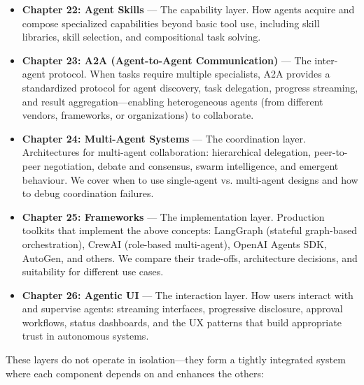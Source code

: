 \begin{itemize}
  \item \textbf{Chapter 22: Agent Skills} --- The capability layer. How agents acquire and compose specialized capabilities beyond basic tool use, including skill libraries, skill selection, and compositional task solving.
  \item \textbf{Chapter 23: A2A (Agent-to-Agent Communication)} --- The inter-agent protocol. When tasks require multiple specialists, A2A provides a standardized protocol for agent discovery, task delegation, progress streaming, and result aggregation---enabling heterogeneous agents (from different vendors, frameworks, or organizations) to collaborate.
  \item \textbf{Chapter 24: Multi-Agent Systems} --- The coordination layer. Architectures for multi-agent collaboration: hierarchical delegation, peer-to-peer negotiation, debate and consensus, swarm intelligence, and emergent behaviour. We cover when to use single-agent vs. multi-agent designs and how to debug coordination failures.
  \item \textbf{Chapter 25: Frameworks} --- The implementation layer. Production toolkits that implement the above concepts: LangGraph (stateful graph-based orchestration), CrewAI (role-based multi-agent), OpenAI Agents SDK, AutoGen, and others. We compare their trade-offs, architecture decisions, and suitability for different use cases.
  \item \textbf{Chapter 26: Agentic UI} --- The interaction layer. How users interact with and supervise agents: streaming interfaces, progressive disclosure, approval workflows, status dashboards, and the UX patterns that build appropriate trust in autonomous systems.
\end{itemize}

These layers do not operate in isolation---they form a tightly integrated system where each component depends on and enhances the others:

